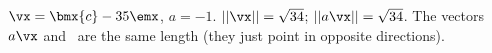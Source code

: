 {$\vx = \bmx{c} -3\\5\emx$, $a = -1$.}
{$||\vx|| = \sqrt{34}$; $||a\vx|| = \sqrt{34}$. The vectors $a\vx$ and \vx\ are the same length (they just point in opposite directions).}